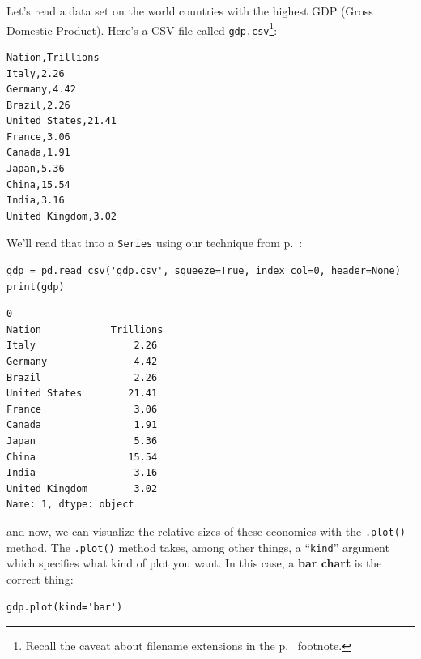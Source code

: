 Let's read a data set on the world countries with the highest GDP (Gross
Domestic Product). Here's a CSV file called \texttt{gdp.csv}\footnote{Recall
the caveat about filename extensions in the p.~\pageref{extensions} footnote.}:

\begin{Verbatim}[fontsize=\small,samepage=true,frame=single,framesep=3mm]
Nation,Trillions
Italy,2.26
Germany,4.42
Brazil,2.26
United States,21.41
France,3.06
Canada,1.91
Japan,5.36
China,15.54
India,3.16
United Kingdom,3.02
\end{Verbatim}


We'll read that into a \texttt{Series} using our technique from
p.~\pageref{read_csv}:

\begin{Verbatim}[fontsize=\small,samepage=true,frame=single,framesep=3mm]
gdp = pd.read_csv('gdp.csv', squeeze=True, index_col=0, header=None)
print(gdp)
\end{Verbatim}
\vspace{-.3in}

\begin{Verbatim}[fontsize=\small,samepage=true,frame=leftline,framesep=5mm,framerule=1mm]
0
Nation            Trillions
Italy                 2.26
Germany               4.42
Brazil                2.26
United States        21.41
France                3.06
Canada                1.91
Japan                 5.36
China                15.54
India                 3.16
United Kingdom        3.02
Name: 1, dtype: object
\end{Verbatim}


and now, we can visualize the relative sizes of these economies with the
\texttt{.plot()} method. The \texttt{.plot()} method takes, among other things,
a ``\texttt{kind}'' argument which specifies what kind of plot you want. In
this case, a \textbf{bar chart} is the correct thing:

\begin{Verbatim}[fontsize=\small,samepage=true,frame=single,framesep=3mm]
gdp.plot(kind='bar')
\end{Verbatim}

